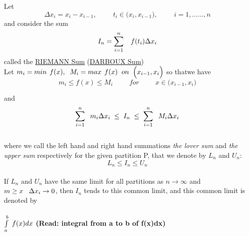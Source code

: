 \documentclass[11pt]{amsbook}
\begin{document}

Let 
$$ \Delta x_i=x_i-x_{i-1}, \hspace{1cm} t_i \in
\Big( x_i, x_{i-1}  \Big), \hspace{1cm} i=1,......, n
$$
and consider the sum 
$$ I_n= \sum_{i=1}^{n} \hspace{.3cm} f(t_i)\Delta x_i $$
called the \underline{RIEMANN Sum} (\underline{DARBOUX Sum})\\

Let $m_i=min \hspace{.15cm}f(x),\hspace{.2cm} M_i= max \hspace{.15cm}f(x)\hspace{.2cm} on \hspace{.2cm}\Big( x_{i-1}, x_i \Big)$ 
\hspace{.2cm}so that\newline we have 
$$ 
m_i \leq f(x) \leq M_i \hspace{1cm}for\hspace{1cm}x \in \Big( x_{i-1}, x_i \Big)
$$

and 
$$
\sum_{i=1}^{n} \hspace{.2cm} m_i\Delta x_i \hspace{.1cm}\leq\hspace{.1cm} I_n\hspace{.1cm} \leq \hspace{.1cm} \sum_{i=1}^{n} \hspace{.2cm} M_i\Delta x_i
$$\\

where we call the left hand  and right hand summations \emph{the lover sum} and \emph{the upper sum} respectively for the given partition P, that we denote by $L_n$ and $U_n$: 
$$
L_n \leq I_n \leq U_n
$$\\
If $L_n$ and $U_n$ have the same limit for all partitions as $n\rightarrow\infty$ and $m\geq x \hspace{.3cm}\Delta x_i \rightarrow 0 $, then $I_n$ tends  to this common limit, and this common limit is denoted by\\
\paragraph{\hspace{1cm}$\int\limits_a^b \hspace{.1cm} f(x)dx$ \hspace{.5cm} (Read: integral from a to b of f(x)dx)\newline}
\end{document}
